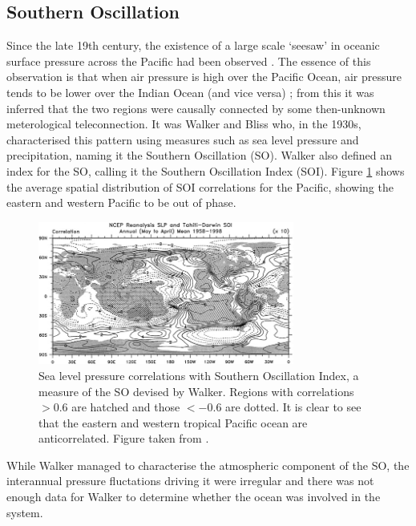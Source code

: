 \subsection{Southern Oscillation}
Since the late 19th century, the existence of a large scale `seesaw' in oceanic
surface pressure across the Pacific had been observed \citep{trenberth2000}. The
essence of this observation is that when air pressure is high over the Pacific
Ocean, air pressure tends to be lower over the Indian Ocean (and vice versa)
\citep{philander1990}; from this it was inferred that the two regions were
causally connected by some then-unknown meterological teleconnection. It was
Walker and Bliss who, in the 1930s, characterised this pattern using measures
such as sea level pressure and precipitation, naming it the Southern Oscillation
(SO). Walker also defined an index for the SO, calling it the Southern
Oscillation Index (SOI). Figure \ref{fig:slp_corr} shows the average spatial
distribution of SOI correlations for the Pacific, showing the eastern and
western Pacific to be out of phase.

\begin{figure}
  \centering
  \includegraphics[width=0.75\textwidth]{figures/slp_corr}
  \caption{Sea level pressure correlations with Southern Oscillation Index, a
    measure of the SO devised by Walker. Regions with correlations $>0.6$ are
    hatched and those $<-0.6$ are dotted. It is clear to see that the eastern
    and western tropical Pacific ocean are anticorrelated. Figure taken from
    \cite{trenberth2000}.
  }
  \label{fig:slp_corr}
\end{figure}

While Walker managed to characterise the atmospheric component of the SO, the
interannual pressure fluctations driving it were irregular and there was not
enough data for Walker to determine whether the ocean was involved in the
system.

